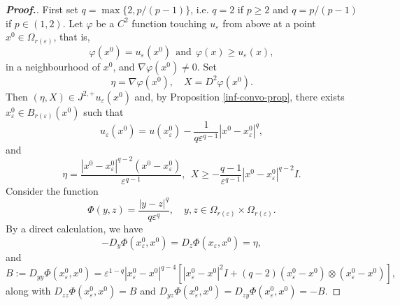 \documentclass[12pt]{amsart}
\newcommand{\1}{\mathbf 1}
\begin{document}
\begin{proof}[\bf Proof.]
First set $q=\max\{2,p/(p-1)\}$, i.e. $q=2$ if $p\geq 2$ and $q=p/(p-1)$ if $p\in(1,2)$.
Let $\varphi$ be a $C^2$ function touching $u_\varepsilon$ from above at a point $x^0\in \Omega_{r(\varepsilon)}$, that is,
\begin{equation}\label{3-4}
\varphi(x^0)=u_\varepsilon(x^0)\ \ \text{and}\ \ \varphi(x)\geq u_\varepsilon(x),
\end{equation}
in a neighbourhood of $x^0$, and $\nabla \varphi(x^0)\neq 0$. Set
\begin{equation}\label{3-5}
\eta=\nabla\varphi(x^0),\quad X=D^2 \varphi(x^0).
\end{equation}
Then $(\eta,X)\in J^{2,+}u_\varepsilon (x^0)$ and, by Proposition \ref{inf-convo-prop}, there exists $x^0_\varepsilon\in B_{r(\varepsilon)}(x^0)$ such that
\begin{equation}\label{3-2}
u_{\varepsilon}(x^0)=u(x^0_\varepsilon)-\frac{1}{q\varepsilon^{q-1}}|x^0-x^0_\varepsilon|^q ,
\end{equation}
and
\begin{equation}\label{3-3}
\eta=\frac{|x^0-x^0_\varepsilon|^{q-2}(x^0-x^0_\varepsilon)}{\varepsilon^{q-1}},\ \ X\geq - \frac{q-1}{\varepsilon^{q-1}}|x^0-x^0_\varepsilon|^{q-2} I.
\end{equation}
Consider the function
\[
\Phi(y,z)=\frac{|y-z|^q}{q\varepsilon^q},\quad y,z\in \Omega_{r(\varepsilon)} \times \Omega_{r(\varepsilon)}.
\]
By a direct calculation, we have
$$
-D_y \Phi(x^0_\varepsilon,x^0)=D_z \Phi(x_\varepsilon,x^0)=\eta,
$$
and
\[
B:=D_{yy} \Phi(x^0_\varepsilon,x^0)=\varepsilon^{1-q}|x^0_\varepsilon-x^0|^{q-4}[|x^0_\varepsilon-x^0|^2I +(q-2)(x^0_\varepsilon-x^0)\otimes (x^0_\varepsilon-x^0)],
\]
along with $D_{zz} \Phi(x^0_\varepsilon,x^0)=B$ and $D_{yz} \Phi(x^0_\varepsilon,x^0)=D_{zy} \Phi(x^0_\varepsilon,x^0)=-B$.


\end{proof}
\end{document}

